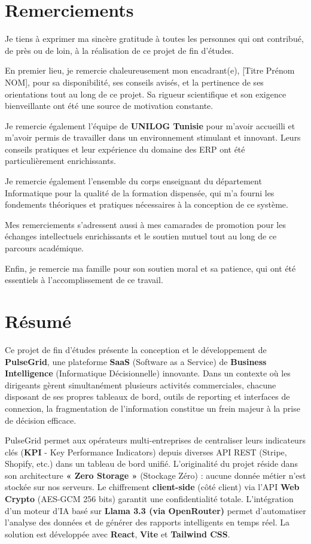 ﻿\documentclass[12pt,a4paper,oneside]{report} %
\begin{document}
\newpage
\chapter*{Remerciements}
Je tiens à exprimer ma sincère gratitude à toutes les personnes qui ont contribué, de près ou de loin, à la réalisation de ce projet de fin d'études.

En premier lieu, je remercie chaleureusement mon encadrant(e), [Titre Prénom NOM], pour sa disponibilité, ses conseils avisés, et la pertinence de ses orientations tout au long de ce projet. Sa rigueur scientifique et son exigence bienveillante ont été une source de motivation constante.

Je remercie également l'équipe de \textbf{UNILOG Tunisie} pour m'avoir accueilli et m'avoir permis de travailler dans un environnement stimulant et innovant. Leurs conseils pratiques et leur expérience du domaine des ERP ont été particulièrement enrichissants.

Je remercie également l'ensemble du corps enseignant du département Informatique pour la qualité de la formation dispensée, qui m'a fourni les fondements théoriques et pratiques nécessaires à la conception de ce système.

Mes remerciements s'adressent aussi à mes camarades de promotion pour les échanges intellectuels enrichissants et le soutien mutuel tout au long de ce parcours académique.

Enfin, je remercie ma famille pour son soutien moral et sa patience, qui ont été essentiels à l'accomplissement de ce travail.

\newpage
\chapter*{Résumé}
Ce projet de fin d'études présente la conception et le développement de \textbf{PulseGrid}, une plateforme \textbf{SaaS} (Software as a Service) de \textbf{Business Intelligence} (Informatique Décisionnelle) innovante. Dans un contexte où les dirigeants gèrent simultanément plusieurs activités commerciales, chacune disposant de ses propres tableaux de bord, outils de reporting et interfaces de connexion, la fragmentation de l'information constitue un frein majeur à la prise de décision efficace.

PulseGrid permet aux opérateurs multi-entreprises de centraliser leurs indicateurs clés (\textbf{KPI} - Key Performance Indicators) depuis diverses API REST (Stripe, Shopify, etc.) dans un tableau de bord unifié. L'originalité du projet réside dans son architecture \textbf{« Zero Storage »} (Stockage Zéro) : aucune donnée métier n'est stockée sur nos serveurs. Le chiffrement \textbf{client-side} (côté client) via l'API \textbf{Web Crypto} (AES-GCM 256 bits) garantit une confidentialité totale. L'intégration d'un moteur d'IA basé sur \textbf{Llama 3.3 (via OpenRouter)} permet d'automatiser l'analyse des données et de générer des rapports intelligents en temps réel. La solution est développée avec \textbf{React}, \textbf{Vite} et \textbf{Tailwind CSS}.
\end{document}
